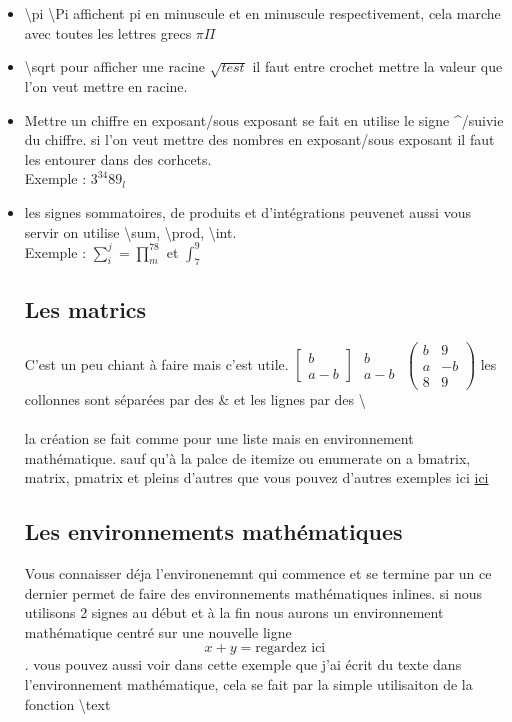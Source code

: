 \documentclass[fontsize=10pt]{article}
\begin{document}
\begin{itemize}
\item \textbackslash pi \textbackslash Pi affichent pi en minuscule et en minuscule respectivement, cela marche avec toutes les lettres grecs $\pi \Pi$
\item \textbackslash sqrt{} pour afficher une racine $\sqrt{test}$ il faut entre crochet mettre la valeur que l'on veut mettre en racine.
\item{Mettre un chiffre en exposant/sous exposant se fait en utilise le signe \textasciicircum /\textunderscore  suivie du chiffre. si l'on veut mettre des nombres en exposant/sous exposant il faut les entourer dans des corhcets. \\Exemple : $3^{34} 89_l$}
\item les signes sommatoires, de produits et d'intégrations peuvenet aussi vous servir on utilise \textbackslash sum, \textbackslash prod, \textbackslash int. \\Exemple :  $\sum_{i}^j = \prod^{78}_m $ et $\int_7^9$

\subsection{Les matrics}
C'est un peu chiant à faire mais c'est utile.
$\begin{bmatrix}
	b  \\
	a-b
	\end{bmatrix}$
$\begin{matrix}
	b  \\
	a-b
	\end{matrix}$
	$\begin{pmatrix}
	b & 9\\
	a & -b\\
	8  & 9 
	\end{pmatrix}$
	les collonnes sont séparées par des \& et les lignes par des \textbackslash\\\\
	la création se fait comme pour une liste mais en environnement mathématique. sauf qu'à la palce de itemize ou enumerate on a bmatrix, matrix, pmatrix et pleins d'autres que vous pouvez d'autres exemples ici \href{https://fr.wikibooks.org/wiki/LaTeX/%C3%89crire_des_math%C3%A9matiques}{ici}
	
\subsection{Les environnements mathématiques}
Vous connaisser déja l'environenemnt qui commence et se termine par un  \textdollar ce dernier permet de faire des environnements mathématiques inlines. si nous utilisons 2 signes  \textdollar au début et à la fin nous aurons un environnement mathématique centré sur une nouvelle ligne $$ x + y =\text{regardez ici}$$ . vous pouvez aussi voir dans cette exemple que j'ai écrit du texte dans l'environnement mathématique, cela se fait par la simple utilisaiton de la fonction  \textbackslash text{}\\


\end{itemize}
\end{document}
